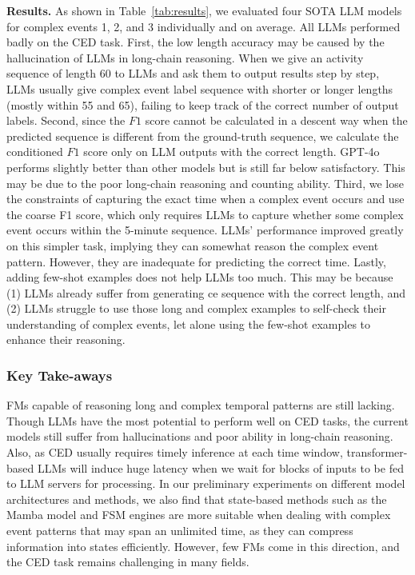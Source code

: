 \textbf{Results.} As shown in Table~\ref{tab:results}, we evaluated four SOTA LLM models for complex events 1, 2, and 3 individually and on average. All LLMs performed badly on the CED task. First, the low length accuracy may be caused by the hallucination of LLMs in long-chain reasoning. When we give an activity sequence of length 60 to LLMs and ask them to output results step by step, LLMs usually give complex event label sequence with shorter or longer lengths (mostly within 55 and 65), failing to keep track of the correct number of output labels. Second, since the $F1$ score cannot be calculated in a descent way when the predicted sequence is different from the ground-truth sequence, we calculate the conditioned $F1$ score only on LLM outputs with the correct length. GPT-4o performs slightly better than other models but is still far below satisfactory. This may be due to the poor long-chain reasoning and counting ability.  Third, we lose the constraints of capturing the exact time when a complex event occurs and use the coarse F1 score, which only requires LLMs to capture whether some complex event occurs within the 5-minute sequence. LLMs' performance improved greatly on this simpler task, implying they can somewhat reason the complex event pattern. However, they are inadequate for predicting the correct time. Lastly, adding few-shot examples does not help LLMs too much. This may be because (1) LLMs already suffer from generating ce sequence with the correct length, and (2) LLMs struggle to use those long and complex examples to self-check their understanding of complex events, let alone using the few-shot examples to enhance their reasoning.

\subsubsection{Key Take-aways}
FMs capable of reasoning long and complex temporal patterns are still lacking. Though LLMs have the most potential to perform well on CED tasks, the current models still suffer from hallucinations and poor ability in long-chain reasoning. Also, as CED usually requires timely inference at each time window, transformer-based LLMs will induce huge latency when we wait for blocks of inputs to be fed to LLM servers for processing. %
In our preliminary experiments on different model architectures and methods, we also find that state-based methods such as the Mamba model and FSM engines are more suitable when dealing with complex event patterns that may span an unlimited time, as they can compress information into states efficiently. However, few FMs come in this direction, and the CED task remains challenging in many fields.
\iffalse

